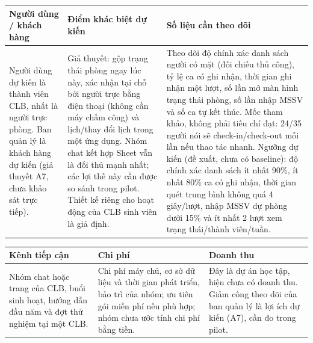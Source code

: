 \begin{tabular}{|>{\raggedright\arraybackslash}p{}|>{\raggedright\arraybackslash}p{}|>{\raggedright\arraybackslash}p{}|}
\hline
\textbf{Người dùng / khách hàng} & \textbf{Điểm khác biệt dự kiến} & \textbf{Số liệu cần theo dõi} \\
\hline
Người dùng dự kiến là thành viên CLB, nhất là người trực phòng. Ban quản lý là khách hàng dự kiến (giả thuyết A7, chưa khảo sát trực tiếp). &
Giả thuyết: gộp trạng thái phòng ngay lúc này, xác nhận tại chỗ bởi người trực bằng điện thoại (không cần máy chấm công) và lịch/thay đổi lịch trong một ứng dụng. Nhóm chat kết hợp Sheet vẫn là đối thủ mạnh nhất; các lợi thế này cần được so sánh trong pilot. Thiết kế riêng cho hoạt động của CLB sinh viên là giả định. &
Theo dõi độ chính xác danh sách người có mặt (đối chiếu thủ công), tỷ lệ ca có ghi nhận, thời gian ghi nhận một lượt, số lần mở màn hình trạng thái phòng, số lần nhập MSSV và số ca tự kết thúc. Mốc tham khảo, không phải tiêu chí đạt: 24/35 người nói sẽ check-in/check-out mỗi lần nếu thao tác nhanh. Ngưỡng dự kiến (đề xuất, chưa có baseline): độ chính xác danh sách ít nhất 90\%, ít nhất 80\% ca có ghi nhận, thời gian quét trung bình không quá 4 giây/lượt, nhập MSSV dự phòng dưới 15\% và ít nhất 2 lượt xem trạng thái/thành viên/tuần. \\
\hline
\end{tabular}
\par\medskip
\begin{tabular}{|>{\raggedright\arraybackslash}p{}|>{\raggedright\arraybackslash}p{}|>{\raggedright\arraybackslash}p{}|}
\hline
\textbf{Kênh tiếp cận} & \textbf{Chi phí} & \textbf{Doanh thu} \\
\hline
Nhóm chat hoặc trang của CLB, buổi sinh hoạt, hướng dẫn đầu năm và đợt thử nghiệm tại một CLB. &
Chi phí máy chủ, cơ sở dữ liệu và thời gian phát triển, bảo trì của nhóm; ưu tiên gói miễn phí nếu phù hợp; nhóm chưa ước tính chi phí bằng tiền. &
Đây là dự án học tập, hiện chưa có doanh thu. Giảm công theo dõi của ban quản lý là lợi ích dự kiến (A7), cần đo trong pilot. \\
\hline
\end{tabular}
\par
\endgroup
\setlength{\tabcolsep}{6pt}

